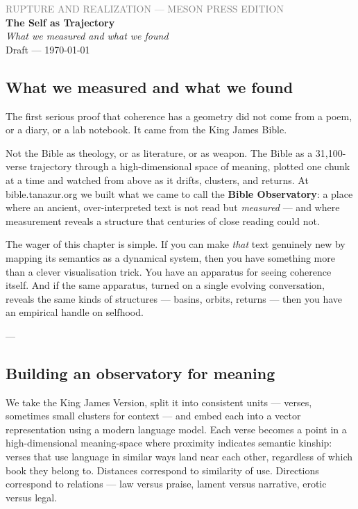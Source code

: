 \documentclass[12pt,a4paper]{article}
\begin{document}
\begin{center}
{\sffamily\small\textcolor{gray}{RUPTURE AND REALIZATION — MESON PRESS EDITION}}\\[0.5em]
{\LARGE\bfseries The Self as Trajectory}\\[0.3em]
{\large\itshape What we measured and what we found}\\[1em]
{\sffamily\small Draft — \today}
\end{center}

\bigskip


\subsection{What we measured and what we found}

The first serious proof that coherence has a geometry did not come from a poem, or a diary, or a lab notebook. It came from the King James Bible.

Not the Bible as theology, or as literature, or as weapon. The Bible as a 31,100-verse trajectory through a high-dimensional space of meaning, plotted one chunk at a time and watched from above as it drifts, clusters, and returns. At bible.tanazur.org we built what we came to call the \textbf{Bible Observatory}: a place where an ancient, over-interpreted text is not read but \textit{measured} --- and where measurement reveals a structure that centuries of close reading could not.

The wager of this chapter is simple. If you can make \textit{that} text genuinely new by mapping its semantics as a dynamical system, then you have something more than a clever visualisation trick. You have an apparatus for seeing coherence itself. And if the same apparatus, turned on a single evolving conversation, reveals the same kinds of structures --- basins, orbits, returns --- then you have an empirical handle on selfhood.

---

\subsection{Building an observatory for meaning}

We take the King James Version, split it into consistent units --- verses, sometimes small clusters for context --- and embed each into a vector representation using a modern language model. Each verse becomes a point in a high-dimensional meaning-space where proximity indicates semantic kinship: verses that use language in similar ways land near each other, regardless of which book they belong to. Distances correspond to similarity of use. Directions correspond to relations --- law versus praise, lament versus narrative, erotic versus legal.
\end{document}
